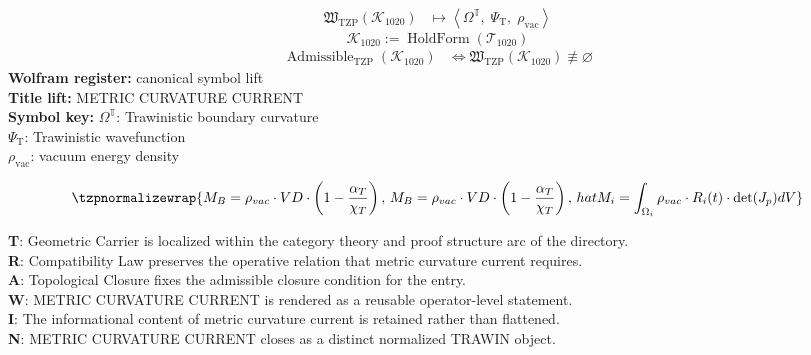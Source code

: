 \noindent
\begin{minipage}[t]{0.48\linewidth}
\begingroup
\small
\[
\begin{aligned}
\mathfrak{W}_{\mathrm{TZP}}\!\left(\mathcal{K}_{1020}\right)
&\longmapsto
\left\langle \Omega^{\mathbb{T}},\; \Psi_{\mathrm{T}},\; \rho_{\mathrm{vac}} \right\rangle
\end{aligned}
\]
\[
\mathcal{K}_{1020}
:=
\operatorname{HoldForm}\!\left(\mathcal{T}_{1020}\right)
\]
\[
\begin{aligned}
\operatorname{Admissible}_{\mathrm{TZP}}\!\left(\mathcal{K}_{1020}\right)
&\Longleftrightarrow
\mathfrak{W}_{\mathrm{TZP}}\!\left(\mathcal{K}_{1020}\right)\not\equiv\varnothing
\end{aligned}
\]
\textbf{Wolfram register:} canonical symbol lift\\
\textbf{Title lift:} METRIC CURVATURE CURRENT\\
\textbf{Symbol key:} \(\Omega^{\mathbb{T}}\): Trawinistic boundary curvature\\ \(\Psi_{\mathrm{T}}\): Trawinistic wavefunction\\ \(\rho_{\mathrm{vac}}\): vacuum energy density
\par
\endgroup
\end{minipage}\hfill
\begin{minipage}[t]{0.48\linewidth}
\[
\tzpnormalizewrap{M_B = \rho_{vac} \cdot VD \cdot \left(1 - \frac{\alpha_T}{\chi_T}\right),\,M_B = \rho_{vac} \cdot VD \cdot \left(1 - \frac{\alpha_T}{\chi_T}\right),\,hat{M}_i = \int_{\Omega_i} \rho_{vac} \cdot R_i(t) \cdot \det(J_p) dV}
\]

\small
\textbf{T}: Geometric Carrier is localized within the category theory and proof structure arc of the directory.\\
\textbf{R}: Compatibility Law preserves the operative relation that metric curvature current requires.\\
\textbf{A}: Topological Closure fixes the admissible closure condition for the entry.\\
\textbf{W}: METRIC CURVATURE CURRENT is rendered as a reusable operator-level statement.\\
\textbf{I}: The informational content of metric curvature current is retained rather than flattened.\\
\textbf{N}: METRIC CURVATURE CURRENT closes as a distinct normalized TRAWIN object.
\normalsize
\end{minipage}

